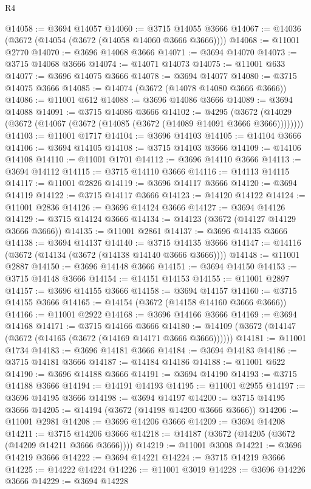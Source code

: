 \begin{lexlean}{R4}
\begin{coremodule}
@14058 := @3694 @14057
@14060 := @3715 @14055 @3666
@14067 := @14036 (@3672 (@14054 (@3672 (@14058 @14060 @3666 @3666))))
@14068 := @11001 @2770
@14070 := @3696 @14068 @3666
@14071 := @3694 @14070
@14073 := @3715 @14068 @3666
@14074 := @14071 @14073
@14075 := @11001 @633
@14077 := @3696 @14075 @3666
@14078 := @3694 @14077
@14080 := @3715 @14075 @3666
@14085 := @14074 (@3672 (@14078 @14080 @3666 @3666))
@14086 := @11001 @612
@14088 := @3696 @14086 @3666
@14089 := @3694 @14088
@14091 := @3715 @14086 @3666
@14102 := @4295
    (@3672 (@14029 (@3672 (@14067 (@3672 (@14085 (@3672 (@14089 @14091 @3666 @3666))))))))
@14103 := @11001 @1717
@14104 := @3696 @14103
@14105 := @14104 @3666
@14106 := @3694 @14105
@14108 := @3715 @14103 @3666
@14109 := @14106 @14108
@14110 := @11001 @1701
@14112 := @3696 @14110 @3666
@14113 := @3694 @14112
@14115 := @3715 @14110 @3666
@14116 := @14113 @14115
@14117 := @11001 @2826
@14119 := @3696 @14117 @3666
@14120 := @3694 @14119
@14122 := @3715 @14117 @3666
@14123 := @14120 @14122
@14124 := @11001 @2836
@14126 := @3696 @14124 @3666
@14127 := @3694 @14126
@14129 := @3715 @14124 @3666
@14134 := @14123 (@3672 (@14127 @14129 @3666 @3666))
@14135 := @11001 @2861
@14137 := @3696 @14135 @3666
@14138 := @3694 @14137
@14140 := @3715 @14135 @3666
@14147 := @14116 (@3672 (@14134 (@3672 (@14138 @14140 @3666 @3666))))
@14148 := @11001 @2887
@14150 := @3696 @14148 @3666
@14151 := @3694 @14150
@14153 := @3715 @14148 @3666
@14154 := @14151 @14153
@14155 := @11001 @2897
@14157 := @3696 @14155 @3666
@14158 := @3694 @14157
@14160 := @3715 @14155 @3666
@14165 := @14154 (@3672 (@14158 @14160 @3666 @3666))
@14166 := @11001 @2922
@14168 := @3696 @14166 @3666
@14169 := @3694 @14168
@14171 := @3715 @14166 @3666
@14180 := @14109 (@3672 (@14147 (@3672 (@14165 (@3672 (@14169 @14171 @3666 @3666))))))
@14181 := @11001 @1734
@14183 := @3696 @14181 @3666
@14184 := @3694 @14183
@14186 := @3715 @14181 @3666
@14187 := @14184 @14186
@14188 := @11001 @622
@14190 := @3696 @14188 @3666
@14191 := @3694 @14190
@14193 := @3715 @14188 @3666
@14194 := @14191 @14193
@14195 := @11001 @2955
@14197 := @3696 @14195 @3666
@14198 := @3694 @14197
@14200 := @3715 @14195 @3666
@14205 := @14194 (@3672 (@14198 @14200 @3666 @3666))
@14206 := @11001 @2981
@14208 := @3696 @14206 @3666
@14209 := @3694 @14208
@14211 := @3715 @14206 @3666
@14218 := @14187 (@3672 (@14205 (@3672 (@14209 @14211 @3666 @3666))))
@14219 := @11001 @3008
@14221 := @3696 @14219 @3666
@14222 := @3694 @14221
@14224 := @3715 @14219 @3666
@14225 := @14222 @14224
@14226 := @11001 @3019
@14228 := @3696 @14226 @3666
@14229 := @3694 @14228

\end{coremodule}
\end{lexlean}
